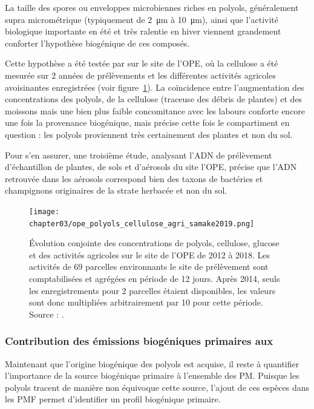 La taille des spores ou enveloppes microbiennes riches en polyols, généralement supra
micrométrique (typiquement de \SI{2}{\micro\m} à \SI{10}{\micro\m}), ainsi que l'activité
biologique importante en été et très ralentie en hiver viennent grandement conforter
l'hypothèse biogénique de ces composés.

Cette hypothèse a été testée par \cite{samakeArabitol2019} sur le site de
l'OPE, où la cellulose a été mesurée sur 2 années de prélèvements et les différentes
activités agricoles avoisinantes enregistrées (voir
figure~\ref{fig:ope_polyols_cellullose_agri}).
La coïncidence entre l'augmentation des concentrations des polyols, de la cellulose
(traceuse des débris de plantes) et des moissons mais une bien plus faible concomitance
avec les labours conforte encore une fois la provenance biogénique, mais précise cette
fois le compartiment en question : les polyols proviennent très certainement des plantes
et non du sol.

Pour s'en assurer, une troisième étude, analysant l'ADN de prélèvement d'échantillon
de plantes, de sols et d'aérosols du site l'OPE, \autocite{samakeHigh2020} précise que
l'ADN retrouvée dans les aérosols correspond bien des taxons de bactéries et champignons
originaires de la strate herbacée et non du sol.

\begin{figure}[ht]
    \centering
    \texttt{[image: chapter03/ope\_polyols\_cellulose\_agri\_samake2019.png]}
    \caption{
        Évolution conjointe des concentrations de polyols, cellulose, glucose et des
        activités agricoles sur le site de l'OPE de 2012 à 2018.
        Les activités de 69 parcelles environnants le site de prélèvement sont
        comptabilisées et agrégées en période de 12 jours.
        Après 2014, seuls les enregistrements pour 2 parcelles étaient disponibles, les
        valeurs sont donc multipliées arbitrairement par 10 pour cette période.
        Source : \cite[figure 6]{samakeArabitol2019}.
    }%
    \label{fig:ope_polyols_cellullose_agri}
\end{figure}

\subsubsection{Contribution des émissions biogéniques primaires aux \PMdix}%
\label{ssub:contribution_des_émissions_biogéniques_primaires_aux_pmdix}

Maintenant que l'origine biogénique des polyols est acquise, il reste à quantifier
l'importance de la source biogénique primaire à l'ensemble des PM.
Puisque les polyols tracent de manière non équivoque cette source, l'ajout de ces espèces dans
les PMF permet d'identifier un profil biogénique primaire.

